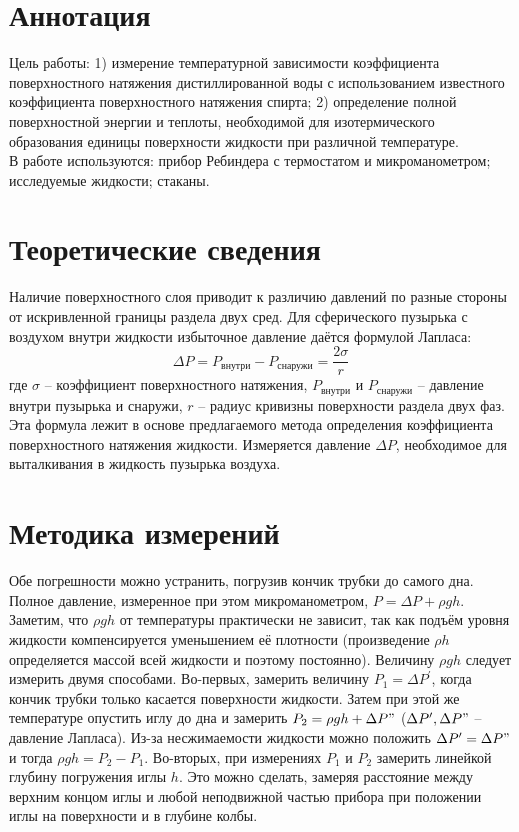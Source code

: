 \documentclass[a4paper,12pt]{article} %
\begin{document}
\section{Аннотация}

Цель работы: 1) измерение температурной зависимости коэффициента поверхностного
натяжения дистиллированной воды с использованием известного коэффициента
поверхностного натяжения спирта; 2) определение полной поверхностной энергии и
теплоты, необходимой для изотермического образования единицы поверхности жидкости
при различной температуре. \\
В работе используются: прибор Ребиндера с термостатом и микроманометром;
исследуемые жидкости; стаканы.

\section{Теоретические сведения}

Наличие поверхностного слоя приводит к различию давлений по разные стороны от
искривленной границы раздела двух сред. Для сферического пузырька с воздухом внутри
жидкости избыточное давление даётся формулой Лапласа:
\begin{equation}
    \Delta P = P_\text{внутри} - P_\text{снаружи} = \frac{2\sigma}{r}
\end{equation}
где $ \sigma $ – коэффициент поверхностного натяжения, $ P_\text{внутри} $ и $ P_\text{снаружи} $ – давление внутри
пузырька и снаружи, $ r $ – радиус кривизны поверхности раздела двух фаз. Эта формула
лежит в основе предлагаемого метода определения коэффициента поверхностного
натяжения жидкости. Измеряется давление $ \Delta P $, необходимое для выталкивания в
жидкость пузырька воздуха.

\section{Методика измерений}

Обе погрешности можно устранить, погрузив кончик трубки до самого дна. Полное
давление, измеренное при этом микроманометром, $ P = \Delta P + \rho gh $. Заметим, что $ \rho gh $ от
температуры практически не зависит, так как подъём уровня жидкости компенсируется
уменьшением её плотности (произведение $ \rho h $ определяется массой всей жидкости и
поэтому постоянно). Величину $ \rho gh $ следует измерить двумя способами. Во-первых,
замерить величину $ P_1 = \Delta P^{'} $, когда кончик трубки только касается поверхности жидкости.
Затем при этой же температуре опустить иглу до дна и замерить $ P_2 = \rho gh + \Delta P" $ ($ \Delta P', \Delta P" $ –
давление Лапласа). Из-за несжимаемости жидкости можно положить $ \Delta P'= \Delta P " $ и тогда
$ \rho gh = P_2-P_1 $. Во-вторых, при измерениях $ P_1 $ и $ P_2 $ замерить линейкой глубину погружения
иглы $ h $.
Это можно сделать, замеряя расстояние между верхним концом иглы и любой
неподвижной частью прибора при положении иглы на поверхности и в глубине колбы. \\
\end{document}
